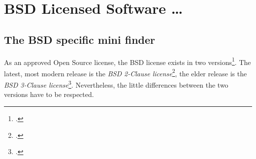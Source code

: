 %
%
%
%
%



\section{BSD Licensed Software \ldots}

\subsection{The BSD specific mini finder}

As an approved Open Source license, the BSD license exists in two
versions\footcite[Following the Open Source Initiative, initially a not approved
BSD license contained a fourth clause also known as advertising clause which
\glqq{}(\ldots) officially was rescinded by the Director of the Office of
Technology Licensing of the University of California on July 22nd, 1999\grqq{}.
 Cf.][\nopage wp. Because of the cancellation you can simply act according the
 \textit{BSD 3-Clause license} if you have to fulfill the eldest BSD
 license]{BsdLicense3Clause}. The latest, most modern release is the \textit{BSD
 2-Clause license}\footcite[cf.][\nopage wp]{BsdLicense2Clause}, the elder
 release is the \textit{BSD 3-Clause license}\footcite[cf.][\nopage
 wp]{BsdLicense3Clause}. Nevertheless, the little differences between the
 two versions have to be respected.

